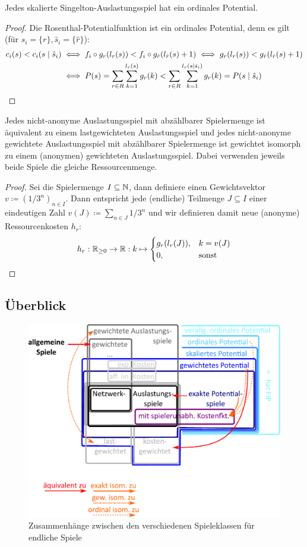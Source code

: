 \begin{satz}
	Jedes skalierte Singelton-Auslastungsspiel hat ein ordinales Potential.
\end{satz}

\begin{proof}
	Die Rosenthal-Potentialfunktion ist ein ordinales Potential, denn es gilt (für $s_i = \{r\}, \hat{s}_i = \{\hat{r}\}$):
	\begin{align*}
	c_i(s) < c_i(s \mid \hat{s}_i) &\iff f_i\circ g_r(l_r(s)) < f_i\circ g_{\hat{r}}(l_{\hat{r}}(s)+1) \iff g_r(l_r(s)) < g_{\hat{r}}(l_{\hat{r}}(s)+1) \\
	&\iff P(s) = \sum_{r \in R}\sum_{k=1}^{l_r(s)} g_r(k) < \sum_{r \in R}\sum_{k=1}^{l_r(s\mid \hat{s}_i)} g_r(k) = P(s\mid \hat{s}_i) \qedhere
	\end{align*}
\end{proof}

\begin{satz}
	Jedes nicht-anonyme Auslastungsspiel mit abzählbarer Spielermenge ist äquivalent zu einem lastgewichteten Auslastungsspiel und jedes nicht-anonyme gewichtete Auslastungsspiel mit abzählbarer Spielermenge ist gewichtet isomorph zu einem (anonymen) gewichteten Auslastungsspiel. Dabei verwenden jeweils beide Spiele die gleiche Ressourcenmenge.
\end{satz}

\begin{proof}
	Sei die Spielermenge $I \subseteq \mathbb{N}$, dann definiere einen Gewichtsvektor $v \coloneqq (1/3^n)_{n \in I}$. Dann entspricht jede (endliche) Teilmenge $J \subseteq I$ einer eindeutigen Zahl $v(J) \coloneqq \sum_{n \in J} 1/3^n$ und wir definieren damit neue (anonyme) Ressourcenkosten $h_r$:
	\[h_r: \mathbb{R}_{\geq 0} \to \mathbb{R}: k \mapsto \begin{cases}
	g_r(l_r(J)), 	&k = v(J) \\
	0,				&\text{sonst}
	\end{cases} \]
\end{proof}



\subsection{Überblick}

\begin{figure}[h]\centering
	\includegraphics[width=.7\textwidth]{../Bilder/EulerDiagramm.pdf}
	\caption{Zusammenhänge zwischen den verschiedenen Spieleklassen für endliche Spiele}
\end{figure}


